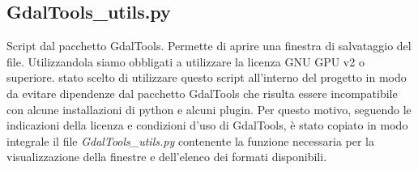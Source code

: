 \subsection{GdalTools\_utils.py}
Script dal pacchetto GdalTools. Permette di aprire una finestra di salvataggio del file. Utilizzandola siamo obbligati a utilizzare la licenza GNU GPU v2 o superiore.
\egrave stato scelto di utilizzare questo script all'interno del progetto in modo da evitare dipendenze dal pacchetto GdalTools che risulta essere incompatibile con alcune installazioni di python e alcuni plugin. Per questo motivo, seguendo le indicazioni della licenza e condizioni d'uso di GdalTools, è stato copiato in modo integrale il file \textit{GdalTools\_utils.py} contenente la funzione necessaria per la visualizzazione della finestre e dell'elenco dei formati disponibili.
